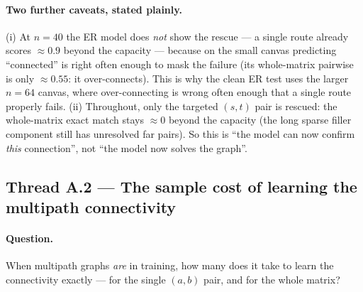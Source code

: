 \documentclass[11pt,a4paper]{article}
\begin{document}
\paragraph{Two further caveats, stated plainly.} (i) At $n=40$ the ER model does \emph{not} show the
rescue --- a single route already scores $\approx0.9$ beyond the capacity --- because on the small
canvas predicting ``connected'' is right often enough to mask the failure (its whole-matrix pairwise
is only $\approx0.55$: it over-connects). This is why the clean ER test uses the larger $n=64$
canvas, where over-connecting is wrong often enough that a single route properly fails. (ii)
Throughout, only the targeted $(s,t)$ pair is rescued: the whole-matrix exact match stays $\approx0$
beyond the capacity (the long sparse filler component still has unresolved far pairs). So this is
``the model can now confirm \emph{this} connection'', not ``the model now solves the graph''.

\subsection{Thread A.2 --- The sample cost of learning the multipath connectivity}
\label{sec:res-multipath-samples}
\paragraph{Question.} When multipath graphs \emph{are} in training, how many does it take to learn
the connectivity exactly --- for the single $(a,b)$ pair, and for the whole matrix?
\end{document}
